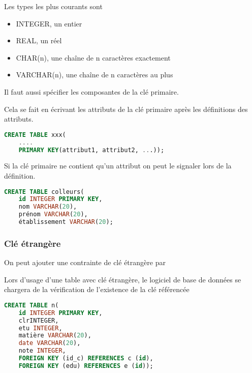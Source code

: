 Les types les plus courants sont
\begin{itemize}
\item INTEGER, un entier
\item REAL, un réel
\item CHAR(n), une chaîne de n caractères exactement
\item VARCHAR(n), une chaîne de n caractères au plus
\end{itemize}
Il faut aussi spécifier les composantes de la clé primaire. 

Cela se fait en écrivant les attributs de la clé primaire après les définitions des attributs. 
\begin{lstlisting}[language=SQL]
CREATE TABLE xxx(
    ....
    PRIMARY KEY(attribut1, attribut2, ...));
\end{lstlisting}
Si la clé primaire ne contient qu'un attribut on peut le signaler lors de la définition.
\begin{lstlisting}[language=SQL]
CREATE TABLE colleurs(
    id INTEGER PRIMARY KEY,
    nom VARCHAR(20),
    prénom VARCHAR(20),
    établissement VARCHAR(20);
\end{lstlisting}
\subsubsection{Clé étrangère}
On peut ajouter une contrainte de clé étrangère par


Lors d'usage d'une table avec clé étrangère, le logiciel de base de données se chargera de la  vérification de l'existence de la clé référencée
\begin{lstlisting}[language=SQL]
CREATE TABLE n(
    id INTEGER PRIMARY KEY,
    clrINTEGER,
    etu INTEGER,
    matière VARCHAR(20),
    date VARCHAR(20),
    note INTEGER,
    FOREIGN KEY (id_c) REFERENCES c (id),
    FOREIGN KEY (edu) REFERENCES e (id));
\end{lstlisting}
